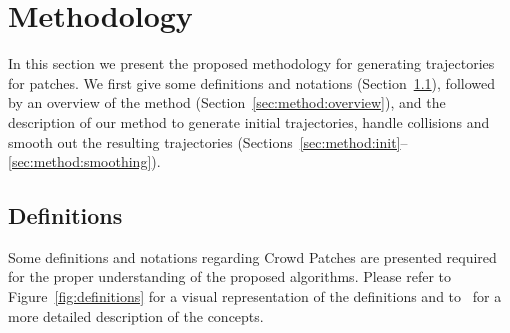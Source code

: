 \section{Methodology}
\label{sec:method}




In this section we present the proposed methodology for generating trajectories for patches.
We first give some definitions and notations (Section~\ref{sec:method:definitions}), followed by an overview of the method (Section~\ref{sec:method:overview}), and the description of our method to generate initial trajectories, handle collisions and smooth out the resulting trajectories (Sections~\ref{sec:method:init}--\ref{sec:method:smoothing}).

\subsection{Definitions}
\label{sec:method:definitions}

Some definitions and notations regarding Crowd Patches are presented required for the proper understanding of the proposed algorithms.
Please refer to Figure~\ref{fig:definitions} for a visual representation of the definitions and to~\cite{Yersin:2009} for a more detailed description of the concepts.


